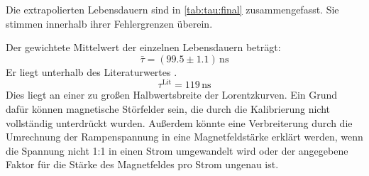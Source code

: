 Die extrapolierten Lebensdauern sind in \autoref{tab:tau:final} zusammengefasst. Sie stimmen innerhalb ihrer Fehlergrenzen überein.

Der gewichtete Mittelwert der einzelnen Lebensdauern beträgt:
\begin{equation}
  \bar{\tau} = (99.5 \pm 1.1)\,\text{ns}
\end{equation}
Er liegt unterhalb des Literaturwertes \cite{manual}.
\begin{equation}
  \tau^{\text{Lit}} = 119\,\text{ns}
\end{equation}
Dies liegt an einer zu großen Halbwertsbreite der Lorentzkurven. Ein Grund dafür können magnetische Störfelder sein, die durch die Kalibrierung nicht 
vollständig unterdrückt wurden. Außerdem könnte eine Verbreiterung durch die Umrechnung der Rampenspannung in eine Magnetfeldstärke erklärt werden, 
wenn die Spannung nicht 1:1 in einen Strom umgewandelt wird oder der angegebene Faktor für die Stärke des Magnetfeldes pro Strom ungenau ist.